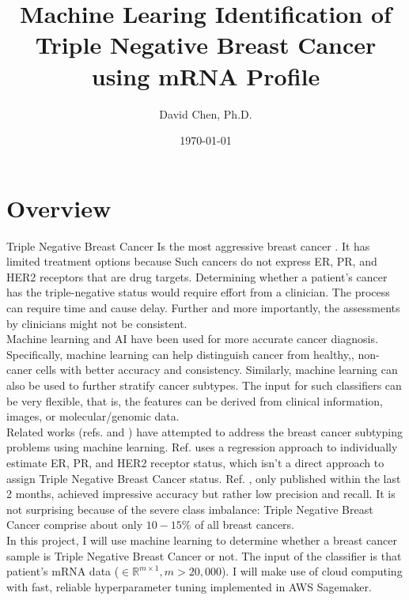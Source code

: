 \documentclass[11pt]{diazessay}
\title{\Large \textbf{Machine Learing Identification of Triple Negative Breast Cancer using mRNA Profile}}
\author{David Chen, Ph.D.}
\date{\today}
\begin{document}
\maketitle



\section{Overview}

Triple Negative Breast Cancer Is the most aggressive breast cancer . It has limited treatment options because Such cancers do not express ER, PR, and HER2 receptors that are drug targets. Determining whether a patient's cancer has the triple-negative status would require effort from a clinician. The process can require time and cause delay. Further and more importantly, the assessments by clinicians might not be consistent. \\

Machine learning and AI have been used for more accurate cancer diagnosis. Specifically, machine learning can help distinguish cancer from healthy,, non-caner cells with better accuracy and consistency. Similarly, machine learning can also be used to further stratify cancer subtypes. The input for such classifiers can be very flexible, that is, the features can be derived from clinical information, images, or molecular/genomic data. \\

Related works (refs.\cite{lehmann2011} and \cite{wu2021}) have attempted to address the breast cancer subtyping problems using machine learning. Ref.\cite{lehmann2011} uses a regression approach to individually estimate  ER, PR, and HER2 receptor status, which isn't a direct approach to assign Triple Negative Breast Cancer status. Ref. \cite{wu2021}, only published within the last 2 months, achieved impressive accuracy but rather low precision and recall. It is not surprising because of the severe class imbalance: Triple Negative Breast Cancer comprise about only $10-15\%$ of all breast cancers. \\

In this project, I will use machine learning to determine whether a breast cancer sample is Triple Negative Breast Cancer or not. The input of the classifier is that patient's mRNA data ($\in \mathbb{R}^{m \times 1}, m > 20,000$).  I will make use of cloud computing with fast, reliable hyperparameter tuning implemented in AWS Sagemaker.
\end{document}
